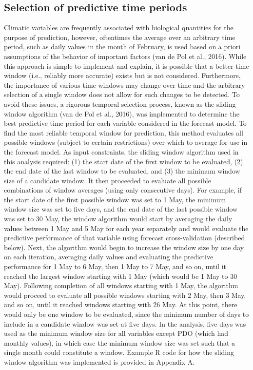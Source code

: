 \documentclass[12pt,]{book}
\theoremstyle{definition}
\theoremstyle{definition}
\theoremstyle{definition}
\theoremstyle{remark}
\begin{document}
\subsection{Selection of predictive time periods}\label{clim-windows}

\noindent
Climatic variables are frequently associated with biological quantities
for the purpose of prediction, however, oftentimes the average over an
arbitrary time period, such as daily values in the month of February, is
used based on a priori assumptions of the behavior of important factors
(van de Pol et al., 2016). While this approach is simple to implement
and explain, it is possible that a better time window (i.e., reliably
more accurate) exists but is not considered. Furthermore, the importance
of various time windows may change over time and the arbitrary selection
of a single window does not allow for such changes to be detected. To
avoid these issues, a rigorous temporal selection process, known as the
sliding window algorithm (van de Pol et al., 2016), was implemented to
determine the best predictive time period for each variable considered
in the forecast model. To find the most reliable temporal window for
prediction, this method evaluates all possible windows (subject to
certain restrictions) over which to average for use in the forecast
model. As input constraints, the sliding window algorithm used in this
analysis required: (1) the start date of the first window to be
evaluated, (2) the end date of the last window to be evaluated, and (3)
the minimum window size of a candidate window. It then proceeded to
evaluate all possible combinations of window averages (using only
consecutive days). For example, if the start date of the first possible
window was set to 1 May, the minimum window size was set to five days,
and the end date of the last possible window was set to 30 May, the
window algorithm would start by averaging the daily values between 1 May
and 5 May for each year separately and would evaluate the predictive
performance of that variable using forecast cross-validation (described
below). Next, the algorithm would begin to increase the window size by
one day on each iteration, averaging daily values and evaluating the
predictive performance for 1 May to 6 May, then 1 May to 7 May, and so
on, until it reached the largest window starting with 1 May (which would
be 1 May to 30 May). Following completion of all windows starting with 1
May, the algorithm would proceed to evaluate all possible windows
starting with 2 May, then 3 May, and so on, until it reached windows
starting with 26 May. At this point, there would only be one window to
be evaluated, since the minimum number of days to include in a candidate
window was set at five days. In the analysis, five days was used as the
minimum window size for all variables except PDO (which had monthly
values), in which case the minimum window size was set such that a
single month could constitute a window. Example R code for how the
sliding window algorithm was implemented is provided in Appendix A.
\end{document}
